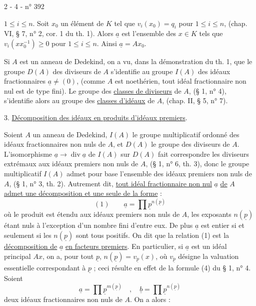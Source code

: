2 - 4 - \hfill n° 392

$1\le i\le n$. Soit $x_0$ un élément de $K$ tel que $v_i(x_0)=q_i$ pour $1\le i\le n$, (chap. VI, § 7, n° 2, cor. 1 du th. 1). Alors $\underline a$ est l'ensemble des $x\in K$ tels que $v_i(xx_0^{-1})\ge0$ pour $1\le i\le n$. Ainsi $\underline a=Ax_0$.

Si $A$ est un anneau de Dedekind, on a vu, dans la démonstration du th. 1, que le groupe $D(A)$ des diviseurs de $A$ s'identifie au groupe $I(A)$ des idéaux fractionnaires $\underline a\ne(0)$, (comme $A$ est noethérien, tout idéal fractionnaire non nul est de type fini). Le groupe des \uline{classes de diviseurs} de $A$, (§ 1, n° 4), s'identifie alors au groupe des \uline{classes d'idéaux} de $A$, (chap. II, § 5, n° 7).

3. \uline{Décomposition des idéaux en produits d'idéaux premiers}.

Soient $A$ un anneau de Dedekind, $I(A)$ le groupe multiplicatif ordonné des idéaux fractionnaires non nuls de $A$, et $D(A)$ le groupe des diviseurs de $A$. L'isomorphisme $\underline a\longrightarrow\operatorname{div}\underline a$ de $I(A)$ sur $D(A)$ fait correspondre les diviseurs extrémaux aux idéaux premiers non nuls de $A$, (§ 1, n° 6, th. 3), donc le groupe multiplicatif $I(A)$ admet pour base l'ensemble des idéaux premiers non nuls de $A$, (§ 1, n° 3, th. 2). Autrement dit, \uline{tout idéal fractionnaire non nul} $\underline a$ \uline{de} $A$ \uline{admet une décomposition et une seule de la forme} :
\[
(1)\qquad\underline a=\prod\underline p^{n(\underline p)}
\]
où le produit est étendu aux idéaux premiers non nuls de $A$, les exposants $n(\underline p)$ étant nuls à l'exception d'un nombre fini d'entre eux. De plus $\underline a$ est entier si et seulement si les $n(\underline p)$ sont tous positifs. On dit que la relation (1) est la \uline{décomposition de} $\underline a$ \uline{en facteurs premiers}. En particulier, si $\underline a$ est un idéal principal $Ax$, on a, pour tout $\underline p$, $n(\underline p)=v_{\underline p}(x)$, où $v_{\underline p}$ désigne la valuation essentielle correspondant à $\underline p$ ; ceci résulte en effet de la formule (4) du § 1, n° 4. Soient
\[
\underline a=\prod\underline p^{m(\underline p)}\quad,\quad\underline b=\prod\underline p^{n(\underline p)}
\]
deux idéaux fractionnaires non nuls de $A$. On a alors :
